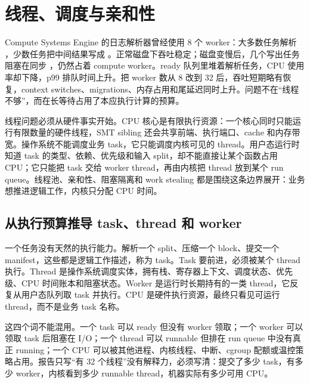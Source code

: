 \chapter{线程、调度与亲和性}

Compute Systems Engine 的日志解析器曾经使用 8 个 worker：大多数任务解析 ，少数任务把中间结果写成 。正常磁盘下吞吐稳定；磁盘变慢后，几个写出任务阻塞在同步 ，仍然占着 compute worker。ready 队列里堆着解析任务，CPU 使用率却下降，p99 排队时间上升。把 worker 数从 8 改到 32 后，吞吐短期略有恢复，context switches、migrations、内存占用和尾延迟同时上升。问题不在“线程不够”，而在长等待占用了本应执行计算的预算。

线程问题必须从硬件事实开始。CPU 核心是有限执行资源：一个核心同时只能运行有限数量的硬件线程，SMT sibling 还会共享前端、执行端口、cache 和内存带宽。操作系统不能调度业务 task，它只能调度内核可见的 thread。用户态运行时知道 task 的类型、依赖、优先级和输入 split，却不能直接让某个函数占用 CPU；它只能把 task 交给 worker thread，再由内核把 thread 放到某个 run queue。线程池、亲和性、阻塞隔离和 work stealing 都是围绕这条边界展开：业务想推进逻辑工作，内核只分配 CPU 时间。

\section{从执行预算推导 task、thread 和 worker}

一个任务没有天然的执行能力。解析一个 split、压缩一个 block、提交一个 manifest，这些都是逻辑工作描述，称为 task。Task 要前进，必须被某个 thread 执行。Thread 是操作系统调度实体，拥有栈、寄存器上下文、调度状态、优先级、CPU 时间账本和阻塞状态。Worker 是运行时长期持有的一类 thread，它反复从用户态队列取 task 并执行。CPU 是硬件执行资源，最终只看见可运行 thread，而不是业务 task 名称。

这四个词不能混用。一个 task 可以 ready 但没有 worker 领取；一个 worker 可以领取 task 后阻塞在 I/O；一个 thread 可以 runnable 但排在 run queue 中没有真正 running；一个 CPU 可以被其他进程、内核线程、中断、cgroup 配额或温控策略占用。报告只写“有 32 个线程”没有解释力，必须写清：提交了多少 task，有多少 worker，内核看到多少 runnable thread，机器实际有多少可用 CPU。

